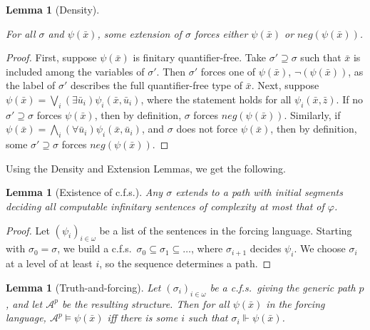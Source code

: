 \documentclass{article}
\newtheorem{lem}[thm]{Lemma}
\begin{document}
\begin{lem}[Density]
\label{lem:density}   

For all $\sigma$ and $\psi(\bar{x})$, some extension of $\sigma$ forces either 
$\psi(\bar{x})$ or $neg(\psi(\bar{x}))$. 

\end{lem}

\begin{proof}

First, suppose $\psi(\bar{x})$ is finitary quantifier-free.  Take $\sigma'\supseteq\sigma$ such that $\bar{x}$ is included among the variables of $\sigma'$.  Then $\sigma'$ forces one of $\psi(\bar{x})$, $\neg(\psi(\bar{x}))$, as the label of $\sigma'$ describes the full quantifier-free type of $\bar{x}$.  
Next, suppose $\psi(\bar{x}) = \bigvee_i(\exists\bar{u}_i)\psi_i(\bar{x},\bar{u}_i)$, where the statement holds for all $\psi_i(\bar{x},\bar{z})$.  If no $\sigma'\supseteq\sigma$ forces $\psi(\bar{x})$, then by definition, $\sigma$ forces $neg(\psi(\bar{x}))$.  
Similarly, if $\psi(\bar{x}) = \bigwedge_i(\forall\bar{u}_i)\psi_i(\bar{x},\bar{u}_i)$, and $\sigma$ does not force $\psi(\bar{x})$, then by definition, some $\sigma'\supseteq\sigma$ forces $neg(\psi(\bar{x}))$.    
\end{proof}

Using the Density and Extension Lemmas, we get the following.

\begin{lem} [Existence of c.f.s.]  

Any $\sigma$ extends to a path with initial segments deciding all computable infinitary sentences of complexity at most that of $\varphi$. 

\end{lem} 

\begin{proof}

Let $(\psi_i)_{i\in\omega}$ be a list of the sentences in the forcing language.  Starting with $\sigma_0 = \sigma$, we build a c.f.s.\ $\sigma_0\subseteq\sigma_1\subseteq\ldots$, where $\sigma_{i+1}$ decides $\psi_i$.  We choose $\sigma_i$ at a level of at least $i$, so the sequence determines a path.    
\end{proof}  

\begin{lem} [Truth-and-forcing]  

Let $(\sigma_i)_{i\in\omega}$ be a c.f.s.\ giving the generic path $p$, and let $\mathcal{A}^p$ be the resulting structure.  Then for all $\psi(\bar{x})$ in the forcing language, $\mathcal{A}^p\models\psi(\bar{x})$ iff there is some $i$ such that $\sigma_i\Vdash\psi(\bar{x})$. 

\end{lem} 
\end{document}
